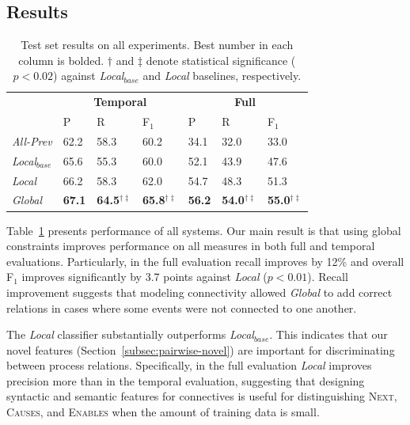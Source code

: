 \subsection{Results} \label{subsec:results}

\begin{table}[t]
\setlength{\tabcolsep}{5pt}
{\footnotesize
\begin{tabular}{  l | l | l | l | l | l | l  }
    & \multicolumn{3}{c|}{\textbf{Temporal}} & \multicolumn{3}{c}{\textbf{Full}} \\
    & P & R & F$_1$ & P & R & F$_1$ \\
\hline
\emph{All-Prev} & 62.2 & 58.3 & 60.2 & 34.1 & 32.0 & 33.0 \\
\emph{Local$_{base}$} & 65.6 & 55.3 & 60.0 &  52.1 & 43.9 & 47.6\\
\emph{Local} & 66.2 & 58.3 & 62.0 & 54.7 & 48.3 & 51.3 \\
\emph{Global} & \textbf{67.1} & \textbf{64.5$^{\dagger\ddagger}$} & \textbf{65.8$^{\dagger\ddagger}$} & \textbf{56.2} & \textbf{54.0$^{\dagger\ddagger}$} & \textbf{55.0$^{\dagger\ddagger}$} 
\end{tabular}}
\caption{Test set results on all experiments. Best number in each column is bolded. $\dagger$ and $\ddagger$ denote statistical significance ($p<0.02$) against \emph{Local$_{base}$} and \emph{Local} baselines, respectively.}
\label{tab:results}
\end{table}

Table~\ref{tab:results} presents performance of all systems. Our main result is that using global constraints improves performance on all measures in both full and temporal evaluations. Particularly, in the full evaluation recall improves by 12\% and overall F$_1$ improves significantly by 3.7 points against \emph{Local} ($p<0.01$). Recall improvement suggests that modeling connectivity allowed \emph{Global} to add correct relations in cases where some events were not connected to one another.

The \emph{Local} classifier substantially outperforms \emph{Local$_{base}$}. This indicates that our novel features (Section~\ref{subsec:pairwise-novel}) are important for discriminating between process relations. Specifically, in the full evaluation \emph{Local} improves precision more than in the temporal evaluation, suggesting that designing syntactic and semantic features for connectives is useful for distinguishing \textsc{Next}, \textsc{Causes}, and \textsc{Enables} when the amount of training data is small.

